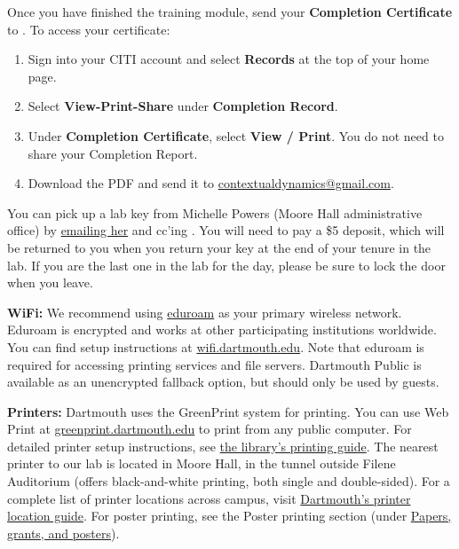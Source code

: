 \documentclass{tufte-book} %
\begin{document}
\noindent Once you have finished the training module, send your
\textbf{Completion Certificate} to \coordinator.  To access your
certificate:
\begin{enumerate}
\item Sign into your CITI account and select \textbf{Records} at the
  top of your home page.
\item Select \textbf{View-Print-Share} under \textbf{Completion
    Record}.
\item Under \textbf{Completion Certificate}, select \textbf{View /
    Print}.  You do not need to share your Completion Report.
\item Download the PDF and send it to
  \href{mailto:contextualdynamics@gmail.com}
  {contextualdynamics@gmail.com}.
\end{enumerate}


\noindent You can pick up a lab key from Michelle Powers (Moore Hall
administrative office) by
\href{mailto:Michelle.A.Powers@dartmouth.edu}{emailing her} and cc'ing
\director.  You will need to pay a \$5 deposit, which will be returned
to you when you return your key at the end of your tenure in the lab.
If you are the last one in the lab for the day, please be sure to lock
the door when you leave.


\noindent \textbf{WiFi:} We recommend using
\href{https://wifi.dartmouth.edu}{eduroam} as your primary wireless
network.  Eduroam is encrypted and works at other participating
institutions worldwide.  You can find setup instructions at
\href{https://wifi.dartmouth.edu}{wifi.dartmouth.edu}.  Note that
eduroam is required for accessing printing services and file servers.
Dartmouth Public is available as an unencrypted fallback option, but
should only be used by guests.

\noindent \textbf{Printers:} Dartmouth uses the GreenPrint system for
printing.  You can use Web Print at
\href{https://greenprint.dartmouth.edu}{greenprint.dartmouth.edu} to
print from any public computer.  For detailed printer setup
instructions, see
\href{https://www.library.dartmouth.edu/research-create/print}{the
  library's printing guide}.  The nearest printer to our lab is
located in Moore Hall, in the tunnel outside Filene Auditorium (offers
black-and-white printing, both single and double-sided).  For a
complete list of printer locations across campus, visit
\href{https://services.dartmouth.edu/TDClient/1806/Portal/KB/ArticleDet?ID=64758}{Dartmouth's
  printer location guide}.  For poster printing, see the Poster printing section (under
\hyperref[sec:papers]{Papers, grants, and posters}).
\end{document}
